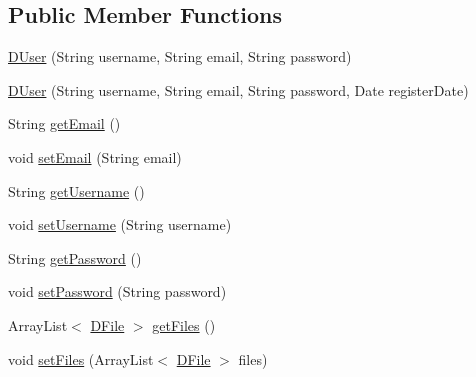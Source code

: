 \subsection*{Public Member Functions}
\begin{DoxyCompactItemize}
\item 
\mbox{\hyperlink{classes_1_1deusto_1_1bspq18_1_1e6_1_1_deusto_box_1_1_server_1_1jdo_1_1data_1_1_d_user_a2c32d9559b50edfe6b9f82a9d71a8e44}{D\+User}} (String username, String email, String password)
\item 
\mbox{\hyperlink{classes_1_1deusto_1_1bspq18_1_1e6_1_1_deusto_box_1_1_server_1_1jdo_1_1data_1_1_d_user_ad4869b5c75336037dc147277e26b4f7e}{D\+User}} (String username, String email, String password, Date register\+Date)
\item 
String \mbox{\hyperlink{classes_1_1deusto_1_1bspq18_1_1e6_1_1_deusto_box_1_1_server_1_1jdo_1_1data_1_1_d_user_ad48eb41eb5d663249829c2bf3e41b445}{get\+Email}} ()
\item 
void \mbox{\hyperlink{classes_1_1deusto_1_1bspq18_1_1e6_1_1_deusto_box_1_1_server_1_1jdo_1_1data_1_1_d_user_a26f6b3bd818fd45a949e2208c1a4f9a5}{set\+Email}} (String email)
\item 
String \mbox{\hyperlink{classes_1_1deusto_1_1bspq18_1_1e6_1_1_deusto_box_1_1_server_1_1jdo_1_1data_1_1_d_user_a0ecf1a356d8572ab99869bf99b952910}{get\+Username}} ()
\item 
void \mbox{\hyperlink{classes_1_1deusto_1_1bspq18_1_1e6_1_1_deusto_box_1_1_server_1_1jdo_1_1data_1_1_d_user_a7191d87258469ab80a12033a5a14784f}{set\+Username}} (String username)
\item 
String \mbox{\hyperlink{classes_1_1deusto_1_1bspq18_1_1e6_1_1_deusto_box_1_1_server_1_1jdo_1_1data_1_1_d_user_ac912b3124e9d650fccf7845caccc2c3c}{get\+Password}} ()
\item 
void \mbox{\hyperlink{classes_1_1deusto_1_1bspq18_1_1e6_1_1_deusto_box_1_1_server_1_1jdo_1_1data_1_1_d_user_ae78de61189d25e247732f5fcdfdf2027}{set\+Password}} (String password)
\item 
Array\+List$<$ \mbox{\hyperlink{classes_1_1deusto_1_1bspq18_1_1e6_1_1_deusto_box_1_1_server_1_1jdo_1_1data_1_1_d_file}{D\+File}} $>$ \mbox{\hyperlink{classes_1_1deusto_1_1bspq18_1_1e6_1_1_deusto_box_1_1_server_1_1jdo_1_1data_1_1_d_user_aa493f2e7b3cfa1d476c01282a966c282}{get\+Files}} ()
\item 
void \mbox{\hyperlink{classes_1_1deusto_1_1bspq18_1_1e6_1_1_deusto_box_1_1_server_1_1jdo_1_1data_1_1_d_user_a37969c962f79f64525f1393b5698fd2c}{set\+Files}} (Array\+List$<$ \mbox{\hyperlink{classes_1_1deusto_1_1bspq18_1_1e6_1_1_deusto_box_1_1_server_1_1jdo_1_1data_1_1_d_file}{D\+File}} $>$ files)

\end{DoxyCompactItemize}
